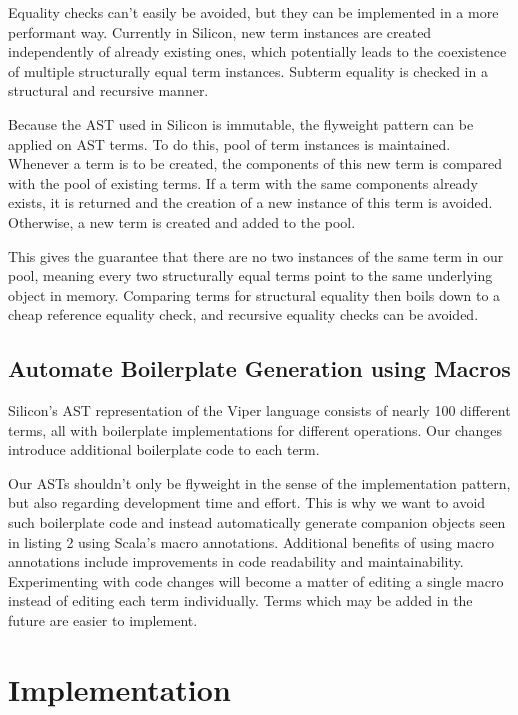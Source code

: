 \documentclass[11pt]{article}
\begin{document}
    Equality checks can't easily be avoided, but they can be implemented in a more performant way.
    Currently in Silicon, new term instances are created independently of already existing ones, which potentially leads 
    to the coexistence of multiple structurally equal term instances. Subterm equality is checked in a
    structural and recursive manner.

    Because the AST used in Silicon is immutable, the flyweight pattern \cite{patterns}
    can be applied on AST terms.
    To do this, pool of term instances is maintained. Whenever a term
    is to be created, the components of this new term is compared with the
    pool of existing terms. If a term with the same components already exists, it is returned and
    the creation of a new instance of this term is avoided. Otherwise, a new term is created and added to
    the pool.

    This gives the guarantee that there are no two instances of the
    same term in our pool, meaning every two structurally equal terms point to the same
    underlying object in memory. Comparing terms for structural equality then boils
    down to a cheap reference equality check, and recursive equality checks can be avoided.

    \subsection{Automate Boilerplate Generation using Macros} \label{approach:macros}

    Silicon's AST representation of the Viper language consists of nearly 100 different terms,
    all with boilerplate implementations for different operations.
    Our changes introduce additional boilerplate code to each term.

    Our ASTs shouldn't only be flyweight in the sense of the implementation pattern, but also
    regarding development time and effort. This is why we want to avoid such boilerplate
    code and instead automatically generate companion objects seen in listing 2 using Scala's macro annotations.
    Additional benefits of using macro annotations include improvements in code
    readability and maintainability. Experimenting with code changes will become a matter
    of editing a single macro instead of editing each term individually.
    Terms which may be added in the future are easier to implement.

    \newpage
    \section{Implementation}
\end{document}
